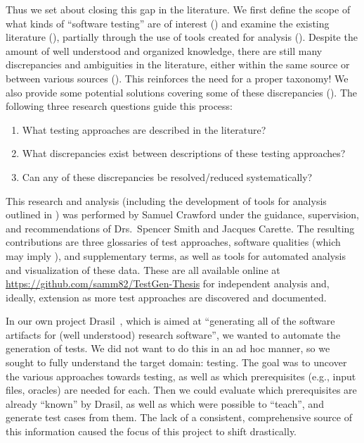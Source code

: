 Thus we set about closing this gap in the literature. We first define the scope
of what kinds of
``software testing'' are of interest () and examine the existing
literature ()\ifnotpaper, partially through the use of tools
created for analysis ()\fi. Despite the amount of well understood
and organized knowledge, there are still many discrepancies and
ambiguities in the literature, either within the same source or between various
sources (). This reinforces the need for a proper taxonomy! We
also provide some potential solutions covering some of these discrepancies
().
\ifnotpaper
    The following three research questions guide this process:
    \begin{enumerate}
        \item What testing approaches are described in the literature?
        \item What discrepancies exist between descriptions of these testing
              approaches?
        \item Can any of these discrepancies be resolved/reduced systematically?
    \end{enumerate}
    This research and analysis (including the development of tools for analysis
    outlined in ) was performed by Samuel Crawford under the
    guidance, supervision, and recommendations of Drs.~Spencer Smith and
    Jacques Carette. The resulting contributions are three glossaries of test
    approaches, software qualities (which may imply ), and
    supplementary terms, as well as tools for automated analysis and
    visualization of these data. These are all available online at
    \url{https://github.com/samm82/TestGen-Thesis} for independent analysis and,
    ideally, extension as more test approaches are discovered and documented.

    In our own project Drasil~\citep{Drasil}, which is aimed at ``generating
    all of the software artifacts for (well understood) research software'', we
    wanted to automate the generation of tests. We did not want to do this
    in an ad hoc manner, so we sought to fully understand the target domain:
    testing. The goal was to uncover the various approaches towards testing, as
    well as which prerequisites (e.g., input files, oracles) are needed for
    each. Then we could evaluate which prerequisites are already ``known'' by
    Drasil, as well as which were possible to ``teach'', and generate test
    cases from them. The lack of a consistent, comprehensive source of this
    information caused the focus of this project to shift drastically.
\fi